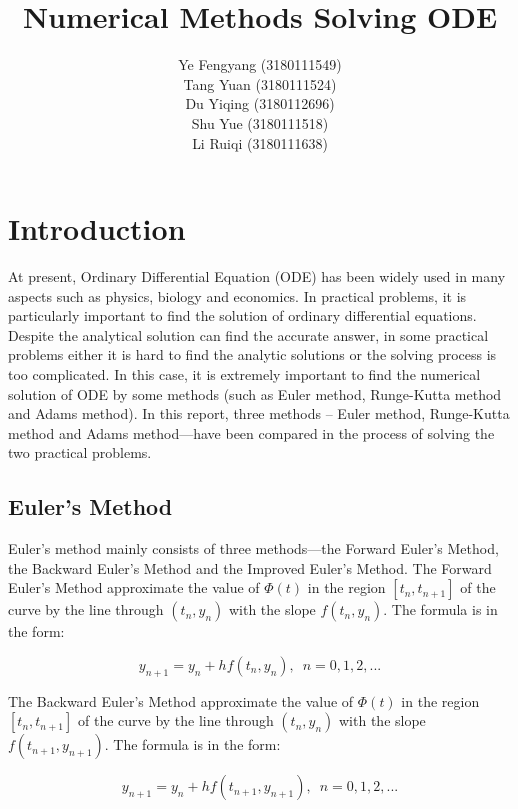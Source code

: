 \documentclass[a4paper]{article}
\title{Numerical Methods Solving ODE}
\author{
	Ye Fengyang (3180111549) \\
	Tang Yuan (3180111524)   \\
	Du Yiqing (3180112696)   \\
	Shu Yue (3180111518)     \\
	Li Ruiqi (3180111638)
}
\begin{document}
	
	\maketitle
	
	\section{Introduction}
	
	At present, Ordinary Differential Equation (ODE) has been widely used in many aspects such as physics, biology and economics. In practical problems, it is particularly important to find the solution of ordinary differential equations. Despite the analytical solution can find the accurate answer, in some practical problems either it is hard to find the analytic solutions or the solving process is too complicated. In this case, it is extremely important to find the numerical solution of ODE by some methods (such as Euler method, Runge-Kutta method and Adams method). In this report, three methods -- Euler method, Runge-Kutta method and Adams method—have been compared in the process of solving the two practical problems.
	
	
	\subsection{Euler’s Method}
	
	Euler’s method mainly consists of three methods—the Forward Euler’s Method, the Backward Euler’s Method and the Improved Euler’s Method.
	The Forward Euler’s Method approximate the value of $\Phi(t)$ in the region $[t_n, t_{n+1}]$ of the curve by the line through $(t_n, y_n)$ with the slope $f(t_n, y_n)$. The formula is in the form:
	
	\begin{equation}\label{eq.1}
		y_{n+1} = y_n + hf(t_n, y_n), \enspace n = 0,1,2,...
	\end{equation}
	
	The Backward Euler’s Method approximate the value of $\Phi(t)$ in the region $[t_n, t_{n+1}]$ of the curve by the line through $(t_n, y_n)$ with the slope $f(t_{n+1}, y_{n+1})$. The formula is in the form:
	
	\begin{equation}\label{eq.2}
		y_{n+1} = y_n + hf(t_{n+1}, y_{n+1}), \enspace n = 0,1,2,...
	\end{equation}	
\end{document}
